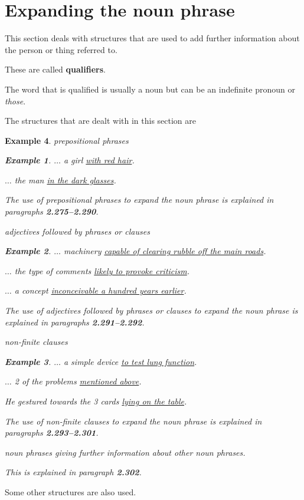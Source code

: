 \documentclass[oneside]{book}
\numberwithin{equation}{section}
\newtheorem{example}{Example}[section]
\begin{document}
\section{Expanding the noun phrase}
\noindent{} This section deals with structures that are used to add further information about the person or thing referred to.

These are called \textbf{qualifiers}.

The word that is qualified is usually a noun but can be an indefinite pronoun or \textit{those}.

%
\noindent{} The structures that are dealt with in this section are
\begin{example}
    \item prepositional phrases
    \begin{example}
        $\ldots$ a girl \underline{with red hair}.
        
        $\ldots$ the man \underline{in the dark glasses}.
    \end{example}
    The use of prepositional phrases to expand the noun phrase is explained in paragraphs \textbf{2.275--2.290}.
    \item adjectives followed by phrases or clauses
    \begin{example}
        $\ldots$ machinery \underline{capable of clearing rubble off the main roads}.
        
        $\ldots$ the type of comments \underline{likely to provoke criticism}.
        
        $\ldots$ a concept \underline{inconceivable a hundred years earlier}.
    \end{example}
    The use of adjectives followed by phrases or clauses to expand the noun phrase is explained in paragraphs \textbf{2.291--2.292}.
    \item non-finite clauses
    \begin{example}
        $\ldots$ a simple device \underline{to test lung function}.
        
        $\ldots$ 2 of the problems \underline{mentioned above}.
        
        He gestured towards the 3 cards \underline{lying on the table}.
    \end{example}
    The use of non-finite clauses to expand the noun phrase is explained in paragraphs \textbf{2.293--2.301}.
    \item noun phrases giving further information about other noun phrases.
    
    This is explained in paragraph \textbf{2.302}.
\end{example}
%
\noindent{} Some other structures are also used.
\end{document}
